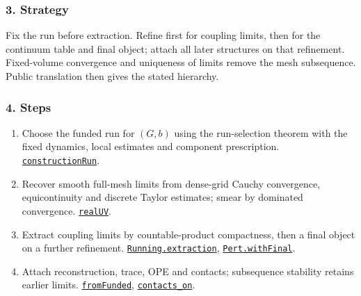 \documentclass[
  letterpaper,
  11pt]{article}
\providecommand{\tightlist}{%
  \setlength{\itemsep}{0pt}\setlength{\parskip}{0pt}}
\begin{document}
\subsubsection{3. Strategy}\label{strategy-31}

Fix the run before extraction. Refine first for coupling limits, then
for the continuum table and final object; attach all later structures on
that refinement. Fixed-volume convergence and uniqueness of limits
remove the mesh subsequence. Public translation then gives the stated
hierarchy.

\subsubsection{4. Steps}\label{steps-31}

\begin{enumerate}
\def\labelenumi{\arabic{enumi}.}
\tightlist
\item
  Choose the funded run for \((G,b)\) using the run-selection theorem
  with the fixed dynamics, local estimates and component prescription.
  \href{https://github.com/yang-mills-group/OpenAI-YM-20261028/blob/3456e5e75cf8d4cd558955a5c7638fba2d68f464/YM/Independent/ConstructionRun.lean\#L14-L28}{\texttt{constructionRun}}.
\item
  Recover smooth full-mesh limits from dense-grid Cauchy convergence,
  equicontinuity and discrete Taylor estimates; smear by dominated
  convergence.
  \href{https://github.com/yang-mills-group/OpenAI-YM-20261028/blob/3456e5e75cf8d4cd558955a5c7638fba2d68f464/YM/FullVolume/Fields/Filled.lean\#L45}{\texttt{realUV}}.
\item
  Extract coupling limits by countable-product compactness, then a final
  object on a further refinement.
  \href{https://github.com/yang-mills-group/OpenAI-YM-20261028/blob/3456e5e75cf8d4cd558955a5c7638fba2d68f464/YM/PertExtension/Running.lean\#L40-L56}{\texttt{Running.extraction}},
  \href{https://github.com/yang-mills-group/OpenAI-YM-20261028/blob/3456e5e75cf8d4cd558955a5c7638fba2d68f464/YM/Pert/Construction.lean\#L21-L31}{\texttt{Pert.withFinal}}.
\item
  Attach reconstruction, trace, OPE and contacts; subsequence stability
  retains earlier limits.
  \href{https://github.com/yang-mills-group/OpenAI-YM-20261028/blob/3456e5e75cf8d4cd558955a5c7638fba2d68f464/YM/R2I/Campaign/Accepted.lean\#L150-L167}{\texttt{fromFunded}},
  \href{https://github.com/yang-mills-group/OpenAI-YM-20261028/blob/3456e5e75cf8d4cd558955a5c7638fba2d68f464/YM/Nonperturbative/Continuum.lean\#L14-L24}{\texttt{contacts\_on}}.

\end{enumerate}
\end{document}
